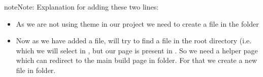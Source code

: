 \documentclass[letterpaper,10pt,english]{sphinxmanual}
\begin{document}
\begin{sphinxadmonition}{note}{Note:}
\sphinxAtStartPar
Explanation for adding these two lines:
\begin{itemize}
\item {} 
\sphinxAtStartPar
As we are not using  theme in our project we need to create a  file in the  folder

\item {} 
\sphinxAtStartPar
Now as we have added a  file,  will try to find a  file in the root directory (i.e.  which we will select in {\hyperref[\detokenize{usage:github-pages}]{}}, but our page is present in . So we need a helper page which can redirect to the main build page in  folder. For that we create a new  file in  folder.

\end{itemize}
\end{sphinxadmonition}
\end{document}
